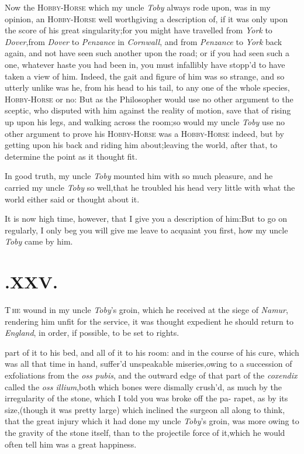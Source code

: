 \documentclass{article}
\begin{document}
Now the \textsc{Hobby-Horse} which my uncle \textit{Toby} always rode
upon, was in my opinion, an \textsc{Hobby-Horse} well worth\break giving
a description of, if it was only upon the score of his great
singularity;\break for you might have travelled from \textit{York} to
\textit{Dover},\tsk  from \textit{Dover} to \textit{Penzance} in
\textit{Cornwall}, and from \textit{Penzance} to \textit{York} back
again, and not have seen such another upon the road; or if you had seen
such a one, whatever haste you had been in, you must infallibly have
stopp’d to have taken a view of him. Indeed, the gait and figure of him
was so strange, and so utterly unlike was he, from his head to his tail,
to any one of the whole species, 
\textsc{Hobby-Horse} or no: But as the Philo\-so\-pher would use no other
argument to the sceptic, who disputed with him against the reality of
motion, save that of rising up upon his legs, and walking across the
room;\tsk  so would my uncle \textit{Toby} use no other argument to
prove his \textsc{Hobby-Horse} was a \textsc{Hobby-Horse} indeed, but by
getting upon his back and riding him about;\tsk  leaving the world,
after that, to determine the point as it thought fit.

In good truth, my uncle \textit{Toby} mounted him with so much
pleasure, and he carried my uncle \textit{Toby} so
well,\tsh  that he troubled his head very little with what
the world either said or thought about it.

It is now high time, however, that I give you a description of
him:\tsk  But to go on regularly, I only beg you will give me
leave to acquaint you first, how my uncle \textit{Toby} came by
him.\\

\section{.\enspace XXV.}

\lettrine{T}{\,he} wound in my uncle
\textit{Toby}’s groin, which he received at the siege of
\textit{Namur}, rendering him unfit for the service, it was thought
expedient he should return to \textit{England}, in order, if
possible, to be set to rights.

\noindent
{}
part of it to his bed, and all of it to his room: and in the
course of his cure, which was all that time in hand, suffer’d
unspeakable miseries,\tsk  owing to a succession of exfoliations
from the \textit{oss pubis}, and the outward edge of that part of
the \textit{coxendix} called the \textit{oss illium},\tsh  both
which bones were dismally crush’d, as much by the irregularity
of the stone, which I told you was broke off the pa-
rapet,\tsk
as by its size,\tsk  (though it was pretty large) which inclined
the surgeon all along to think, that the great injury which it
had done my uncle \textit{Toby}’s groin, was more owing to the
gravity of the stone itself, than to the projectile force of
it,\tsk  which he would often tell him was a great happiness.
\end{document}
